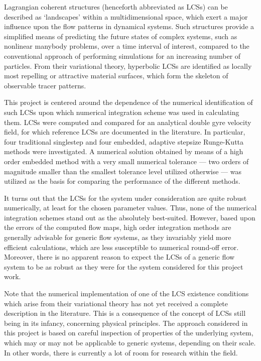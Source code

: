 Lagrangian coherent structures (henceforth abbreviated as LCSs) can be described
as `landscapes' within a multidimensional space, which exert a major influence
upon the flow patterns in dynamical systems. Such structures provide a
simplified means of predicting the future states of complex systems, such as
nonlinear manybody problems, over a time interval of interest, compared to the
conventional approach of performing simulations for an increasing number of
particles. From their variational theory, hyperbolic LCSs are identified as
locally most repelling or attractive material surfaces, which form the skeleton
of observable tracer patterns.

This project is centered around the dependence of the numerical identification
of such LCSs upon which numerical integration scheme was used in calculating
them. LCSs were computed and compared for an analytical double gyre velocity
field, for which reference LCSs are documented in the literature. In particular,
four traditional singlestep and four embedded, adaptive
stepsize Runge-Kutta methods were investigated.
A numerical solution obtained by means of a high order embedded method with
a very small numerical tolerance --- two orders of magnitude smaller than the
smallest tolerance level utilized otherwise --- was utilized as the basis
for comparing the performance of the different methods.

It turns out that the LCSs for the system under consideration are quite robust
numerically, at least for the chosen parameter values. Thus, none of the
numerical integration schemes stand out as the absolutely best-suited. However,
based upon the errors of the computed flow maps, high order integration
methods are generally advisable for generic flow systems, as they invariably
yield more efficient calculations, which are less susceptible to numerical
round-off error. Moreover, there is no apparent reason to expect the LCSs of
a generic flow system to be as robust as they were for the system considered
for this project work.

Note that the numerical implementation of one of the LCS existence conditions
which arise from their variational theory has not yet received a complete
description in the literature. This is a consequence of the concept of LCSs
still being in its infancy, concerning physical principles. The approach
considered in this project is based on careful inspection of properties of the
underlying system, which may or may not be applicable to generic systems,
depending on their scale. In other words, there is currently a lot of room for
research within the field.

